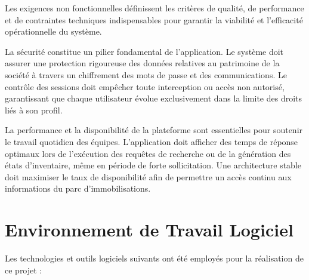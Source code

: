 Les exigences non fonctionnelles définissent les critères de qualité, de performance et de contraintes techniques indispensables pour garantir la viabilité et l'efficacité opérationnelle du système.

La sécurité constitue un pilier fondamental de l'application. Le système doit assurer une protection rigoureuse des données relatives au patrimoine de la société à travers un chiffrement des mots de passe et des communications. Le contrôle des sessions doit empêcher toute interception ou accès non autorisé, garantissant que chaque utilisateur évolue exclusivement dans la limite des droits liés à son profil.

La performance et la disponibilité de la plateforme sont essentielles pour soutenir le travail quotidien des équipes. L'application doit afficher des temps de réponse optimaux lors de l'exécution des requêtes de recherche ou de la génération des états d'inventaire, même en période de forte sollicitation. Une architecture stable doit maximiser le taux de disponibilité afin de permettre un accès continu aux informations du parc d'immobilisations.

\section{Environnement de Travail Logiciel}

Les technologies et outils logiciels suivants ont été employés pour la réalisation de ce projet :

